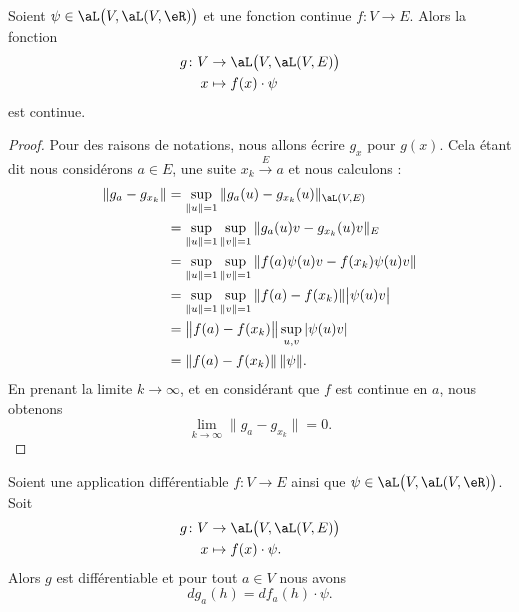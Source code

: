 \begin{lemma}
	Soient \( \psi\in\aL\big( V,\aL(V,\eR) \big)\) et une fonction continue \( f\colon V\to E\). Alors la fonction
	\begin{equation}
		\begin{aligned}
			g\colon V & \to \aL\big( V,\aL(V,E) \big) \\
			x         & \mapsto f(x)\cdot \psi
		\end{aligned}
	\end{equation}
	est continue.
\end{lemma}

\begin{proof}
	Pour des raisons de notations, nous allons écrire \( g_x\) pour \( g(x)\). Cela étant dit nous considérons \( a\in E\), une suite \( x_k\stackrel{E}{\longrightarrow}a \) et nous calculons :
	\begin{subequations}
		\begin{align}
			\| g_a-g_{x_k} \| & =\sup_{\| u \|=1}\| g_a(u)-g_{x_k}(u) \|_{\aL(V,E)}                    \\
			                  & =\sup_{\| u \|=1}\sup_{\| v \|=1}\| g_a(u)v-g_{x_k}(u)v \|_{E}         \\
			                  & =\sup_{\| u \|=1}\sup_{\| v \|=1}\| f(a)\psi(u)v-f(x_k)\psi(u)v \|     \\
			                  & =\sup_{\| u \|=1}\sup_{\| v \|=1}\| f(a)-f(x_k) \|\big| \psi(u)v \big| \\
			                  & =\big\| f(a)-f(x_k) \big\|\sup_{u,v}| \psi(u)v |                       \\
			                  & =\| f(a)-f(x_k) \|\,\| \psi \|.
		\end{align}
	\end{subequations}
	En prenant la limite \( k\to \infty\), et en considérant que \( f\) est continue en \( a\), nous obtenons
	\begin{equation}
		\lim_{k\to \infty} \| g_a-g_{x_k} \|=0.
	\end{equation}
\end{proof}

\begin{lemma}
	Soient une application différentiable \( f\colon V\to E\) ainsi que \( \psi\in\aL\big( V,\aL(V,\eR) \big)\). Soit
	\begin{equation}
		\begin{aligned}
			g\colon V & \to \aL\big(V, \aL(V,E) \big) \\
			x         & \mapsto f(x)\cdot \psi.
		\end{aligned}
	\end{equation}
	Alors \( g\) est différentiable et pour tout \( a\in V\) nous avons
	\begin{equation}
		dg_a(h)=df_a(h)\cdot \psi.
	\end{equation}
\end{lemma}

